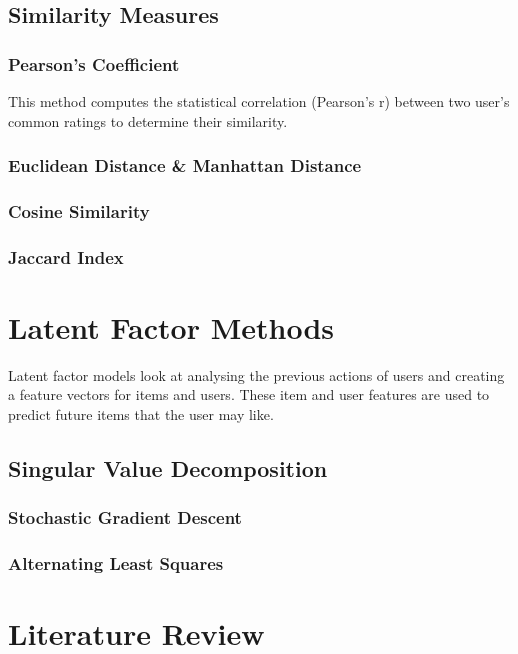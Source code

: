 \subsection{Similarity Measures}
\subsubsection{Pearson's Coefficient}

This method computes the statistical correlation
(Pearson’s r) between two user’s common ratings to determine
their similarity.

\subsubsection{Euclidean Distance \& Manhattan Distance}
\subsubsection{Cosine Similarity}
\subsubsection{Jaccard Index}

\section{Latent Factor Methods}

Latent factor models look at analysing the previous actions of users and creating a feature vectors for items and users. These item and user features are used to predict future items that the user may like. 

\subsection{Singular Value Decomposition}
\subsubsection{Stochastic Gradient Descent}
\subsubsection{Alternating Least Squares}


\section{Literature Review}

